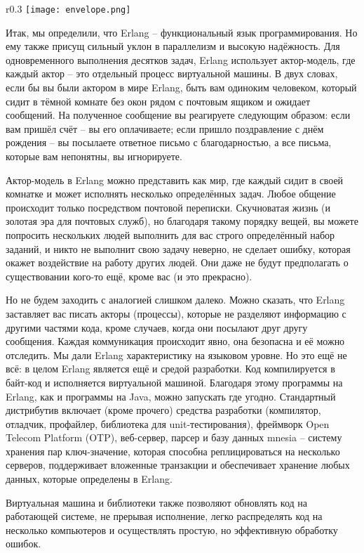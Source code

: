 \begin{wrapfigure}{r}{0.3\linewidth}
    \texttt{[image: envelope.png]}
\end{wrapfigure}
Итак, мы определили, что Erlang \--- функциональный язык программирования.
Но ему также присущ сильный уклон в параллелизм и высокую надёжность.
Для одновременного выполнения десятков задач, Erlang использует актор\--модель, где каждый актор \--- это отдельный процесс виртуальной машины.
В двух словах, если бы вы были актором в мире Erlang, быть вам одиноким человеком, который сидит в тёмной комнате без окон рядом с почтовым ящиком и ожидает сообщений.
На полученное сообщение вы реагируете следующим образом: если вам пришёл счёт \--- вы его оплачиваете; если пришло поздравление с днём рождения \--- вы посылаете ответное письмо с благодарностью, а все письма, которые вам непонятны, вы игнорируете.

Актор\--модель в Erlang можно представить как мир, где каждый сидит в своей комнатке и может исполнять несколько определённых задач.
Любое общение происходит только посредством почтовой переписки.
Скучноватая жизнь (и золотая эра для почтовых служб), но благодаря такому порядку вещей, вы можете попросить нескольких людей выполнить для вас строго определённый набор заданий, и никто не выполнит свою задачу неверно, не сделает ошибку, которая окажет воздействие на работу других людей.
Они даже не будут предполагать о существовании кого\--то ещё, кроме вас (и это прекрасно).

Но не будем заходить с аналогией слишком далеко.
Можно сказать, что Erlang заставляет вас писать акторы (процессы), которые не разделяют информацию с другими частями кода, кроме случаев, когда они посылают друг другу сообщения.
Каждая коммуникация происходит явно, она безопасна и её можно отследить.
Мы дали Erlang характеристику на языковом уровне.
Но это ещё не всё: в целом Erlang является ещё и средой разработки.
Код компилируется в байт\--код и исполняется виртуальной машиной.
Благодаря этому программы на Erlang, как и программы на Java, можно запускать где угодно.
Стандартный дистрибутив включает (кроме прочего) средства разработки (компилятор, отладчик, профайлер, библиотека для unit\--тестирования), фреймворк Open Telecom Platform (OTP), веб\--сервер, парсер и базу данных mnesia \--- систему хранения пар ключ\--значение, которая способна реплицироваться на несколько серверов, поддерживает вложенные транзакции и обеспечивает хранение любых данных, которые определены в Erlang.

Виртуальная машина и библиотеки также позволяют обновлять код на работающей системе, не прерывая исполнение, легко распределять код на несколько компьютеров и осуществлять простую, но эффективную обработку ошибок.

